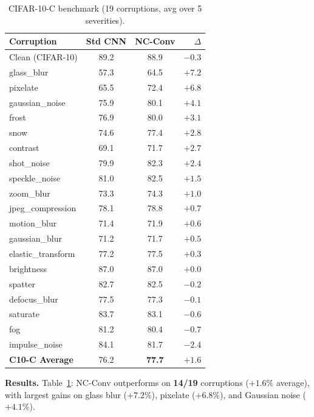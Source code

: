 \documentclass[runningheads]{llncs}
\begin{document}
\begin{table}[t]
\centering
\caption{CIFAR-10-C benchmark (19 corruptions, avg over 5 severities).}
\label{tab:cifar10c}
\small
\setlength{\tabcolsep}{3pt}
\begin{tabular}{@{}lcc r@{}}
\toprule
\textbf{Corruption} & \textbf{Std CNN} & \textbf{NC-Conv} & $\Delta$ \\
\midrule
Clean (CIFAR-10)    & 89.2 & 88.9 & $-0.3$ \\
\midrule
glass\_blur         & 57.3 & 64.5 & $\mathbf{+7.2}$ \\
pixelate            & 65.5 & 72.4 & $\mathbf{+6.8}$ \\
gaussian\_noise     & 75.9 & 80.1 & $+4.1$ \\
frost               & 76.9 & 80.0 & $+3.1$ \\
snow                & 74.6 & 77.4 & $+2.8$ \\
contrast            & 69.1 & 71.7 & $+2.7$ \\
shot\_noise         & 79.9 & 82.3 & $+2.4$ \\
speckle\_noise      & 81.0 & 82.5 & $+1.5$ \\
zoom\_blur          & 73.3 & 74.3 & $+1.0$ \\
jpeg\_compression   & 78.1 & 78.8 & $+0.7$ \\
motion\_blur        & 71.4 & 71.9 & $+0.6$ \\
gaussian\_blur      & 71.2 & 71.7 & $+0.5$ \\
elastic\_transform  & 77.2 & 77.5 & $+0.3$ \\
brightness          & 87.0 & 87.0 & $+0.0$ \\
spatter             & 82.7 & 82.5 & $-0.2$ \\
defocus\_blur       & 77.5 & 77.3 & $-0.1$ \\
saturate            & 83.7 & 83.1 & $-0.6$ \\
fog                 & 81.2 & 80.4 & $-0.7$ \\
impulse\_noise      & 84.1 & 81.7 & $-2.4$ \\
\midrule
\textbf{C10-C Average} & 76.2 & \textbf{77.7} & $\mathbf{+1.6}$ \\
\bottomrule
\end{tabular}
\end{table}

\noindent\textbf{Results.}
Table~\ref{tab:cifar10c}: NC-Conv outperforms on \textbf{14/19} corruptions ($+1.6\%$ average), with largest gains on glass blur ($+7.2\%$), pixelate ($+6.8\%$), and Gaussian noise ($+4.1\%$).
\end{document}
